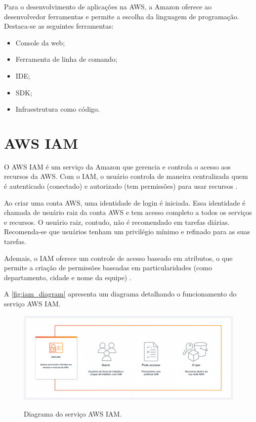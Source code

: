 Para o desenvolvimento de aplicações na AWS, a Amazon oferece ao desenvolvedor ferramentas e permite a escolha da linguagem de programação. Destaca-se as seguintes ferramentas:

\begin{itemize}
    \item Console da web;
    \item Ferramenta de linha de comando;
    \item IDE;
    \item SDK;
    \item Infraestrutura como código.
\end{itemize}

\section{AWS IAM}

O AWS IAM é um serviço da Amazon que gerencia e controla o acesso aos recursos da AWS. Com o IAM, o usuário controla de maneira centralizada quem é autenticado (conectado) e autorizado (tem permissões) para usar recursos \cite{ref:010}.

Ao criar uma conta AWS, uma identidade de login é iniciada. Essa identidade é chamada de usuário raiz da conta AWS e tem acesso completo a todos os serviços e recursos. O usuário raiz, contudo, não é recomendado em tarefas diárias. Recomenda-se que usuários tenham um privilégio mínimo e refinado para as suas tarefas.

Ademais, o IAM oferece um controle de acesso baseado em atributos, o que permite a criação de permissões baseadas em particularidades (como departamento, cidade e nome da equipe) \cite{ref:011}.

A \autoref{fig:iam_diagram} apresenta um diagrama detalhando o funcionamento do serviço AWS IAM.

\begin{figure}[htb]
    \centering
    \caption{Diagrama do serviço AWS IAM.}
    \includegraphics[scale=0.3]{Imagens/iam_diagram.png}
    \label{fig:iam_diagram}
\end{figure}

